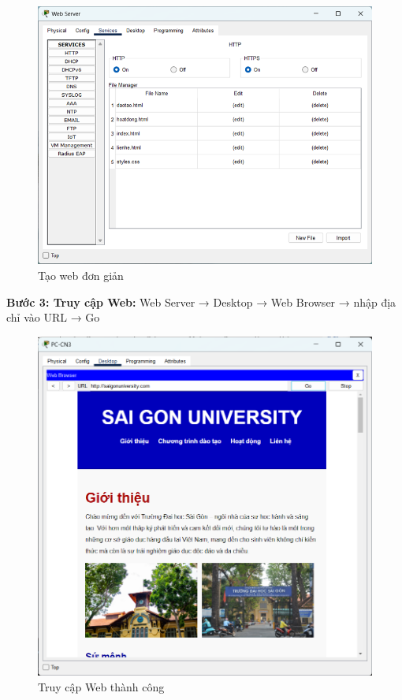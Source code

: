 \documentclass[12pt, a4paper]{article}
\begin{document}
\begin{flushleft}
\begin{itemize}[leftmargin=0.75cm]
\begin{figure}[H]
				\includegraphics[width=1\textwidth]{web_accesshttp.png}
				\caption{Tạo web đơn giản}
			\end{figure}
		\end{itemize}
		\newpage
		\textbf{Bước 3: Truy cập Web:} Web Server → Desktop → Web Browser →  nhập địa chỉ vào URL → Go
		\begin{figure}[H]
			\centering
			\includegraphics[width=1\textwidth]{web_creation.png}
			\caption{Truy cập Web thành công}
		\end{figure}
	\end{flushleft}
	
\end{document}

